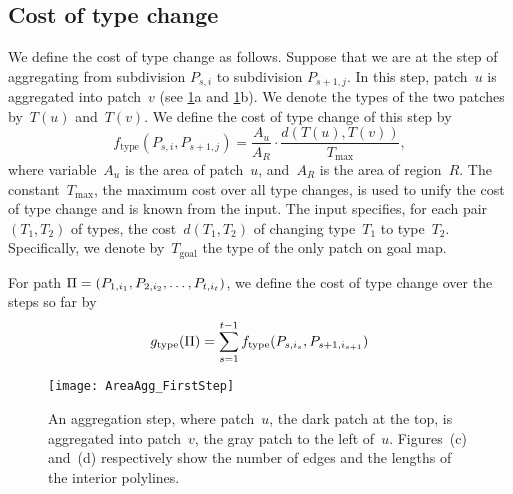 \subsection{Cost of type change}
We define the cost of type change as follows.
Suppose that we are at the step of 
aggregating from subdivision $P_{s,i}$ to subdivision 
$P_{s+1,j}$. 
In this step, patch~$u$ is aggregated into patch~$v$
(see \figs\ref{fig:AreaAgg_FirstStep}a 
and \ref{fig:AreaAgg_FirstStep}b).
We denote the types of the two patches by~$T(u)$ and~$T(v)$. 
We define the cost of type change of this step by
\begin{equation}
\label{eq:f_type}
f_\mathrm{type}(P_{s,i},P_{s+1,j})=\frac{A_{u}}{A_R}
\cdot
\frac{d(T(u),T(v))}{T_{\max}},
\end{equation}
where variable~$A_u$ is the area of patch~$u$, 
and~$A_R$ is the area of region~$R$.
The constant~$T_{\max}$, the maximum cost over all type changes, 
is used to unify the cost of type change 
and is known from the input. 
The input specifies, for each pair~$(T_1,T_2)$ of types, 
the cost~$d(T_1,T_2)$ of changing type~$T_1$ to type~$T_2$.
Specifically, we denote by~$T_\mathrm{goal}$ the type of 
the only patch on goal map.


For path $\Pi=(P_{1,i_1}, P_{2,i_2}, \dots, 
P_{t,i_{t}})$,
we define the cost of type change over the steps so far by
\begin{equation}
\label{eq:g_type}
g_\mathrm{type}(\Pi)=
\sum_{s=1}^{t-1}f_\mathrm{type}(P_{s,i_s},P_{s+1,i_{s+1}})
\end{equation}

\begin{figure}[tb]
	\centering
	\texttt{[image: AreaAgg\_FirstStep]}
	\caption{An aggregation step, 
	where patch~$u$, the dark patch at the top,
	is aggregated into patch~$v$, the gray patch to the left of~$u$.
	Figures~(c) and~(d) respectively show the number of edges and the lengths of the interior polylines.}
	\label{fig:AreaAgg_FirstStep}	
\end{figure}




